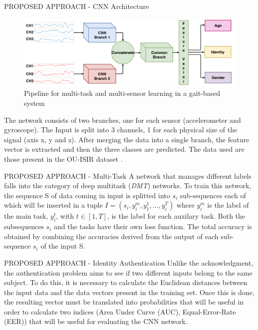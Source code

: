 \begin{frame}{PROPOSED APPROACH - CNN Architecture}
    \begin{figure}[htbp]
        \centering
        \includegraphics[width = 0.8 \linewidth]{images/paper5/architecture.png}
        \centering
        \caption{Pipeline for multi-task and multi-sensor learning in a gait-based system}
        \label{fig:pipeline}
    \end{figure}
    The network consists of two branches, one for each sensor (accelerometer 
    and gyroscope). The Input is split into 3 channels, 1 for each physical 
    size of the signal (axis x, y and z). After merging the data into a single 
    branch, the feature vector is extracted and then the three classes are 
    predicted. The data used are those present in the OU-ISIR dataset \small{}.
\end{frame}

\begin{frame}{PROPOSED APPROACH - Multi-Task}
    A network that manages different labels falls into the category of deep 
    multitask (\emph{DMT}) networks. To train this network, the sequence S of data 
    coming in input is splitted into $ s_i $ sub-sequences each of which will be 
    inserted in a tuple $ I = (s_i, y_i^m, y_1^1, ..., y_i^T) $ where $ y_i^m $ is the label of the 
    main task, $ y_i^t $, with $ t \in [1,T] $, is the label for each auxilary task. Both 
    the subsequences $ s_i $ and the tasks have their own loss function. The  total  
    accuracy  is  obtained  by combining the accuracies derived from the output 
    of each sub-sequence $ s_i $  of  the  input  S.
\end{frame}

\begin{frame}{PROPOSED APPROACH - Identity Authentication}
    Unlike the acknowledgment, the authentication problem aims to see if 
    two different inputs belong to the same subject. To do this, it is necessary 
    to calculate the Euclidean distances between the input data and the data 
    vectors present in the training set. Once this is done, the resulting vector 
    must be translated into probabilities that will be useful in order to 
    calculate two indices (Area Under Curve (AUC), Equal-Error-Rate 
    (EER)) that will be useful for evaluating the CNN network.
\end{frame}

